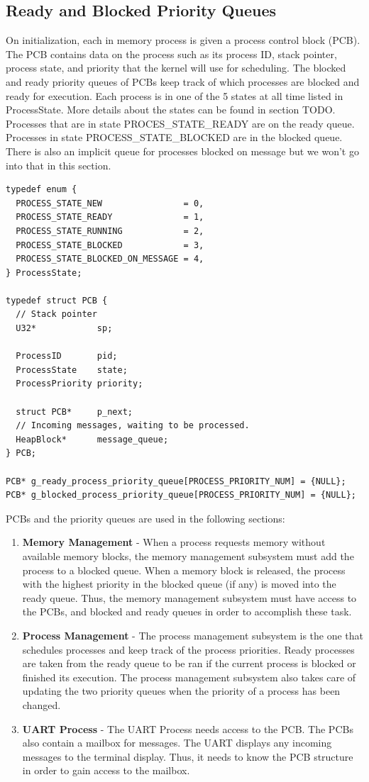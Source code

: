 \documentclass[12pt]{report}
\begin{document}
\subsection{Ready and Blocked Priority Queues}
On initialization, each in memory process is given a process control block (PCB). The PCB contains data on the process such as its process ID, stack pointer, process state, and priority that the kernel will use for scheduling. The blocked and ready priority queues of PCBs keep track of which processes are blocked and ready for execution. Each process is in one of the 5 states at all time listed in ProcessState. More details about the states can be found in section TODO. Processes that are in state PROCES\_STATE\_READY are on the ready queue. Processes in state PROCESS\_STATE\_BLOCKED are in the blocked queue. There is also an implicit queue for processes blocked on message but we won't go into that in this section.

\begin{lstlisting}
typedef enum {
  PROCESS_STATE_NEW                = 0,
  PROCESS_STATE_READY              = 1,
  PROCESS_STATE_RUNNING            = 2,
  PROCESS_STATE_BLOCKED            = 3,
  PROCESS_STATE_BLOCKED_ON_MESSAGE = 4,
} ProcessState;

typedef struct PCB {
  // Stack pointer
  U32*            sp;

  ProcessID       pid;
  ProcessState    state;
  ProcessPriority priority;

  struct PCB*     p_next;
  // Incoming messages, waiting to be processed.
  HeapBlock*      message_queue;
} PCB;

PCB* g_ready_process_priority_queue[PROCESS_PRIORITY_NUM] = {NULL};
PCB* g_blocked_process_priority_queue[PROCESS_PRIORITY_NUM] = {NULL};
\end{lstlisting}

PCBs and the priority queues are used in the following sections:
\begin{enumerate}
    \item {\bf Memory Management} - When a process requests memory without available memory blocks, the memory management subsystem must add the process to a blocked queue. When a memory block is released, the process with the highest priority in the blocked queue (if any) is moved into the ready queue. Thus, the memory management subsystem must have access to the PCBs, and blocked and ready queues in order to accomplish these task.
    \item {\bf Process Management} - The process management subsystem is the one that schedules processes and keep track of the process priorities. Ready processes are taken from the ready queue to be ran if the current process is blocked or finished its execution. The process management subsystem also takes care of updating the two priority queues when the priority of a process has been changed.
    \item {\bf UART Process} - The UART Process needs access to the PCB. The PCBs also contain a mailbox for messages. The UART displays any incoming messages to the terminal display. Thus, it needs to know the PCB structure in order to gain access to the mailbox.
\end{enumerate}
\end{document}
